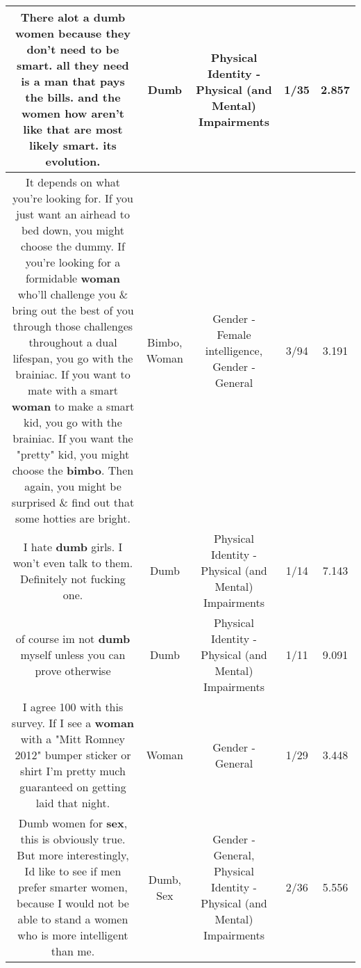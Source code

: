 \documentclass[11pt]{article}
\newlength\mylength
\begin{document}
\begin{center}
\begin{longtable}{|C{.65\mylength}|C{.30\mylength}|C{.12\mylength}|C{.12\mylength}|C{.12\mylength}|}
  \small There alot a \textbf{dumb} women because they don't need to be smart. all they need is a man that pays the bills. and the women how aren't like that are most likely smart. its evolution.\normalsize   & Dumb & Physical Identity - Physical (and Mental) Impairments & 1/35 & 2.857 \\  \hline
  \small It depends on what you're looking for. If you just want an airhead to bed down, you might choose the dummy. If you're looking for a formidable \textbf{woman} who'll challenge you \& bring out the best of you through those challenges throughout a dual lifespan, you go with the brainiac. If you want to mate with a smart \textbf{woman} to make a smart kid, you go with the brainiac. If you want the "pretty" kid, you might choose the \textbf{bimbo}. Then again, you might be surprised \& find out that some hotties are bright.\normalsize   & Bimbo, Woman & Gender - Female intelligence, Gender - General & 3/94 & 3.191 \\  \hline
  \small I hate \textbf{dumb} girls. I won't even talk to them. Definitely not fucking one.\normalsize   & Dumb & Physical Identity - Physical (and Mental) Impairments & 1/14 & 7.143 \\  \hline
  \small of course im not \textbf{dumb} myself unless you can prove otherwise\normalsize   & Dumb & Physical Identity - Physical (and Mental) Impairments & 1/11 & 9.091 \\  \hline
  \small I agree 100 with this survey. If I see a \textbf{woman} with a "Mitt Romney 2012" bumper sticker or shirt I'm pretty much guaranteed on getting laid that night.\normalsize   & Woman & Gender - General & 1/29 & 3.448 \\  \hline
  \small Dumb women for \textbf{sex}, this is obviously true. But more interestingly, Id like to see if men prefer smarter women, because I would not be able to stand a women who is more intelligent than me.\normalsize   & Dumb, Sex & Gender - General, Physical Identity - Physical (and Mental) Impairments & 2/36 & 5.556 \\  \hline

\end{longtable}
\end{center}
\end{document}
